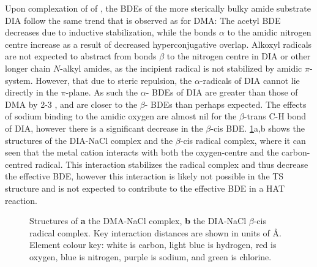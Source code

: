 Upon complexation of  of , the BDEs of the more sterically
bulky amide substrate DIA follow the same trend that is observed as for DMA:
The acetyl  BDE decreases due to inductive stabilization, while the
 bonds $\alpha$ to the amidic nitrogen centre increase as a result of
decreased hyperconjugative overlap. Alkoxyl radicals are not expected to
abstract from  bonds $\beta$ to the nitrogen centre in DIA or other
longer chain $N$-alkyl amides, as the incipient radical is not stabilized by
amidic $\pi$-system. However, that due to steric repulsion, the
$\alpha$-radicals of DIA cannot lie directly in the $\pi$-plane. As such the
$\alpha$- BDEs of DIA are greater than those of DMA by 2-3 \kcalmol,
and are closer to the $\beta$- BDEs than perhaps expected. The effects
of sodium binding to the amidic oxygen are almost nil for the $\beta$-trans C-H
bond of DIA, however there is a significant decrease in the $\beta$-cis
 BDE.  \ref{fig:dia-na-cl}a,b shows the structures of the DIA-NaCl
complex and the $\beta$-cis radical complex, where it can seen that the metal
cation interacts with both the oxygen-centre and the carbon-centred radical.
This interaction stabilizes the radical complex and thus decrease the effective
BDE, however this interaction is likely not possible in the TS structure and is
not expected to contribute to the effective BDE in a HAT reaction.

\begin{figure}[!htbp]
	\centering


  \caption[Structures of the DIA-NaCl complex and radical complex.]{Structures
  of \textbf{a} the DMA-NaCl complex, \textbf{b} the DIA-NaCl $\beta$-cis
  radical complex. Key interaction distances are shown in units of \AA. Element
  colour key: white is carbon, light blue is hydrogen, red is oxygen, blue is
  nitrogen, purple is sodium, and green is chlorine.} \label{fig:dia-na-cl}
\end{figure}

